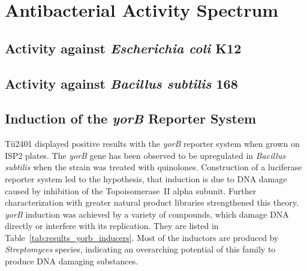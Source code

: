     


\section{Antibacterial Activity Spectrum} %
\label{sec:antibacterial_activity_spectrum}


    \subsection{Activity against \textit{Escherichia coli} K12} %
    \label{sub:activity_against_e_coli}


    \subsection{Activity against \textit{Bacillus subtilis} 168} %
    \label{sub:activity_against_b_subtilis}


    \subsection{Induction of the \textit{yorB} Reporter System} %
    \label{sub:induction_of_the_yorb_reporter_system}

    Tü2401 displayed positive results with the \textit{yorB} reporter system when grown on ISP2 plates.
    The \textit{yorB} gene has been observed to be upregulated in \textit{Bacillus subtilis} when the strain was treated with quinolones.\autocite{Hutter2004a}
    Construction of a luciferase reporter system led to the hypothesis, that induction is due to DNA damage caused by inhibition of the Topoisomerase~II alpha subunit.\autocite{Hutter2004}
    Further characterization with greater natural product libraries strengthened this theory.\autocite{Mariner2011,Urban2007}
    \textit{yorB} induction was achieved by a variety of compounds, which damage DNA directly or interfere with its replication.
    They are listed in Table~\ref{tab:results_yorb_inducers}.
    Most of the inductors are produced by \textit{Streptomyces} species, indicating an overarching potential of this family to produce DNA damaging substances.
    
